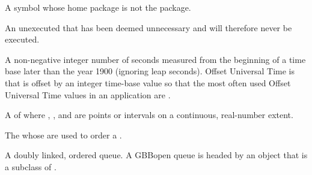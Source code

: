 \begin{glossary-list}

%
%
%
A symbol whose home package is not the  package.


%
%
%
%
%
%
%
%
An unexecuted  that has been deemed unnecessary and will
therefore never be executed.


%
%
A non-negative integer number of seconds measured from the beginning of a time
base later than the year 1900 (ignoring leap seconds).  Offset Universal Time
is  that is offset by an integer time-base value so that
the most often used Offset Universal Time values in an application are
.



%
%
%
%
%
A  of   where
, , and  
are points or intervals on a continuous, real-number extent.


%
%
The  whose  are used to order a
.


%
%
%
%
A doubly linked, ordered queue.  A GBBopen queue is headed by an object that
is a subclass of .



\end{glossary-list}

